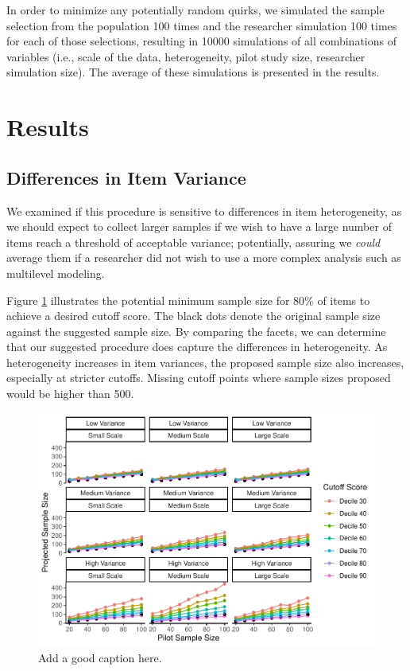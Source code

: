 \documentclass[
  man]{apa6}
\begin{document}
In order to minimize any potentially random quirks, we simulated the sample selection from the population 100 times and the researcher simulation 100 times for each of those selections, resulting in 10000 simulations of all combinations of variables (i.e., scale of the data, heterogeneity, pilot study size, researcher simulation size). The average of these simulations is presented in the results.

\hypertarget{results}{%
\section{Results}\label{results}}

\hypertarget{differences-in-item-variance}{%
\subsection{Differences in Item Variance}\label{differences-in-item-variance}}

We examined if this procedure is sensitive to differences in item heterogeneity, as we should expect to collect larger samples if we wish to have a large number of items reach a threshold of acceptable variance; potentially, assuring we \emph{could} average them if a researcher did not wish to use a more complex analysis such as multilevel modeling.

Figure \ref{fig:item-figure} illustrates the potential minimum sample size for 80\% of items to achieve a desired cutoff score. The black dots denote the original sample size against the suggested sample size. By comparing the facets, we can determine that our suggested procedure does capture the differences in heterogeneity. As heterogeneity increases in item variances, the proposed sample size also increases, especially at stricter cutoffs. Missing cutoff points where sample sizes proposed would be higher than 500.

\begin{figure}
\centering
\includegraphics{manuscript_draft_files/figure-latex/item-figure-1.pdf}
\caption{\label{fig:item-figure}Add a good caption here.}
\end{figure}
\end{document}
